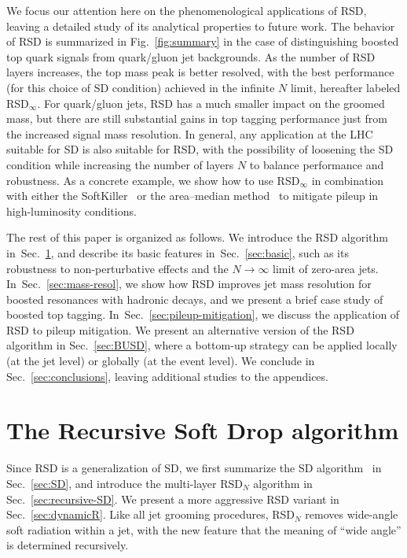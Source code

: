 \documentclass[11pt,a4paper]{article}
\DeclareRobustCommand{\Sec}[1]{Sec.~\ref{#1}}
\DeclareRobustCommand{\Fig}[1]{Fig.~\ref{#1}}
\begin{document}
We focus our attention here on the phenomenological applications of
RSD, leaving a detailed study of its analytical properties to future
work.
%
The behavior of RSD is summarized in \Fig{fig:summary} in the case of distinguishing 
boosted top quark signals from quark/gluon jet
backgrounds.
%
As the number of RSD layers increases, the top mass peak is better
resolved, with the best performance (for this choice of SD condition)
achieved in the infinite $N$ limit, hereafter labeled RSD$_\infty$.
%
For quark/gluon jets, RSD has a much smaller impact on the groomed
mass, but there are still substantial gains in top tagging performance
just from the increased signal mass resolution.
%
In general, any application at the LHC suitable for SD is also
suitable for RSD, with the possibility of loosening the SD condition
while increasing the number of layers $N$ to balance performance and
robustness.
%
As a concrete example, we show how to use RSD$_\infty$ in combination
with either the SoftKiller~\cite{Cacciari:2014gra} or the area--median
method~\cite{Cacciari:2007fd,Cacciari:2008gn} to mitigate pileup in
high-luminosity conditions.

The rest of this paper is organized as follows.
%
We introduce the RSD algorithm in~\Sec{sec:recSD-alg}, and describe
its basic features in~\Sec{sec:basic}, such as its robustness to
non-perturbative effects and the $N\rightarrow\infty$ limit of
zero-area jets.
%
In~\Sec{sec:mass-resol}, we show how RSD improves jet mass resolution
for boosted resonances with hadronic decays, and we present a brief
case study of boosted top tagging.
%
In~\Sec{sec:pileup-mitigation}, we discuss the application of RSD to
pileup mitigation.
%
We present an alternative version of the RSD algorithm in
\Sec{sec:BUSD}, where a bottom-up strategy can be
applied locally (at the jet level) or globally (at the event level).
%
We conclude in \Sec{sec:conclusions}, leaving additional studies to
the appendices.

\section{The Recursive Soft Drop algorithm}
\label{sec:recSD-alg}


Since RSD is a generalization of SD, we first summarize the SD
algorithm~\cite{Larkoski:2014wba} in \Sec{sec:SD}, and introduce the
multi-layer RSD$_N$ algorithm in \Sec{sec:recursive-SD}.  
%
We present a more aggressive RSD variant in \Sec{sec:dynamicR}.
%
Like all jet
grooming procedures, RSD$_N$ removes wide-angle soft radiation within
a jet, with the new feature that the meaning of ``wide angle'' is
determined recursively.
\end{document}
